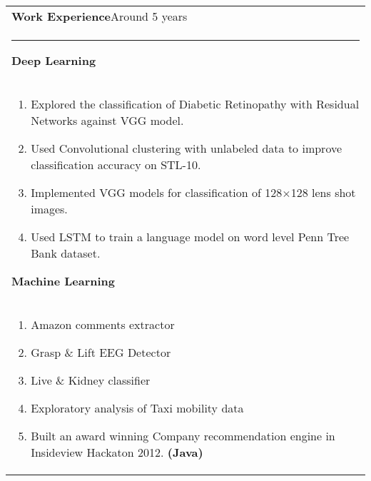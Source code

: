 \documentclass{article}
\begin{document}
\begin{tabular}{p{\dimexpr\linewidth-2\tabcolsep}}
    \textbf{\large{Work Experience}}\hfill Around 5 years \\
    \noindent\rule{\textwidth}{0.4pt}
    \bfseries \large{Deep Learning} \\
    \begin{enumerate}
        \item Explored the classification of Diabetic Retinopathy with Residual Networks against VGG model.
        \item Used Convolutional clustering with unlabeled data to improve classification accuracy on STL-10.
        \item Implemented VGG models for classification of 128$\times$128 lens shot images.
        \item Used LSTM to train a language model on word level Penn Tree Bank dataset.
    \end{enumerate}

    \bigskip
    \bfseries \large{Machine Learning} \\
    \begin{enumerate}
        \item Amazon comments extractor
        \item Grasp \& Lift EEG Detector
        \item Live \& Kidney classifier
        \item Exploratory analysis of Taxi mobility data
        \item Built an award winning Company recommendation engine in Insideview Hackaton 2012. \textbf{(Java)}
    \end{enumerate}


\end{tabular}
\end{document}
